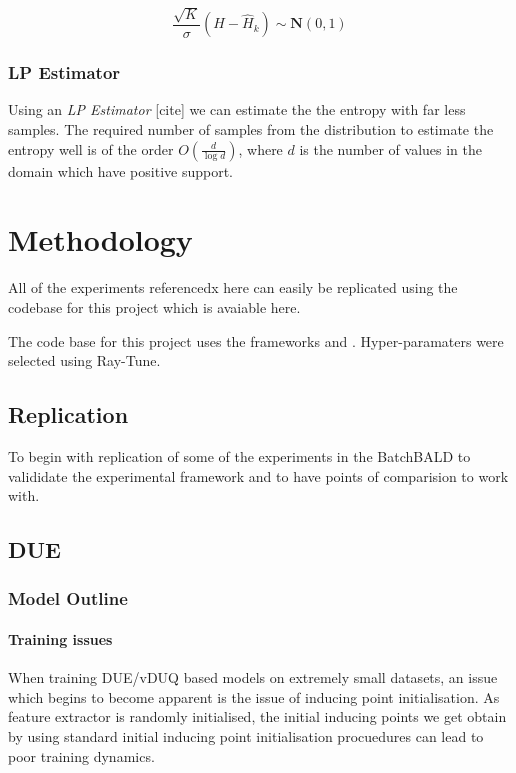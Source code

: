 \documentclass[12pt, a4paper]{report}
\theoremstyle{definition}
\begin{document}
$$ \frac{\sqrt{K}}{\sigma} \left(H - \hat{H}_k \right) \sim \mathbf{N} \left(0, 1 \right) $$



\subsection{LP Estimator}

Using an \textit{LP Estimator} [cite] we can estimate the the entropy with far less samples. The required number of samples from the distribution to estimate the entropy well is of the order $O \left( \frac{d}{\log{d}}\right)$, where $d$ is the number of values in the domain which have positive support.



\chapter{Methodology}
\label{Chap6}

All of the experiments referencedx here can easily be replicated using the codebase for this project which is avaiable here.

The code base for this project uses the frameworks \cite[Pytorch]{NEURIPS2019_9015} and \cite[GPytorch]{gardner2018gpytorch}. Hyper-paramaters were selected using Ray-Tune.



\section{Replication}

To begin with replication of some of the experiments in the BatchBALD to valididate the experimental framework and to have points of comparision to work with.




\section{DUE}

\subsection{Model Outline}


\subsubsection{Training issues}

When training DUE/vDUQ based models on extremely small datasets, an issue which begins to become apparent is the issue of inducing point initialisation. As feature extractor is randomly initialised, the initial inducing points we get obtain by using standard initial inducing point initialisation procuedures can lead to poor training dynamics.
\end{document}
